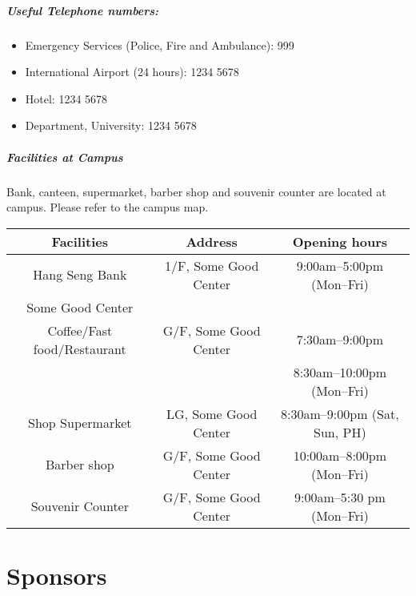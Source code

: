\documentclass[openany,parskip=half,12pt,a4paper,table]{scrbook}
\begin{document}
{\paragraph{Useful Telephone numbers:}
\begin{itemize}
	\item Emergency Services (Police, Fire and Ambulance): 999
	\item International Airport (24 hours): 1234 5678
	\item Hotel: 1234 5678
	\item Department, University: 1234 5678
\end{itemize}

\paragraph{Facilities at Campus}
Bank, canteen, supermarket, barber shop and souvenir counter are located at campus. Please refer to the campus map.
\begin{table}[H]
	\centering
	\begin{tabular}{|c|c|c|}
		\hline
		\textbf{Facilities} & \textbf{Address} & \textbf{Opening hours} \\\hline
		Hang Seng Bank & 1/F, Some Good Center & 9:00am--5:00pm (Mon--Fri) \\\hline
		
	 	\rowcolor{\tbc} Some Good Center &   &  \\ 	
		 \rowcolor{\tbc} Coffee/Fast food/Restaurant & \multirow{-2}{*}{G/F, Some Good Center} & \multirow{-2}{*}{ 7:30am--9:00pm} \\\hline
		
		&  & 8:30am--10:00pm (Mon--Fri) \\
		\multirow{-2}{*}{Shop Supermarket} & \multirow{-2}{*}{LG, Some Good Center} & 8:30am--9:00pm (Sat, Sun, PH) \\\hline
		\rowcolor{\tbc} Barber shop & G/F, Some Good Center & 10:00am--8:00pm (Mon--Fri) \\\hline
		Souvenir Counter &	G/F, Some Good Center & 9:00am--5:30 pm (Mon--Fri) \\\hline
	\end{tabular}
\end{table}

\newpage

\chapter{Sponsors}

}
\end{document}
